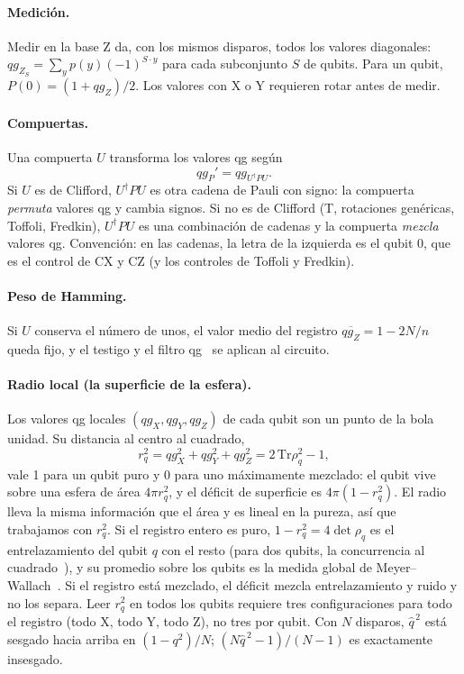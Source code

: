 \documentclass[11pt]{article}
\newcommand{\q}[1]{qg_{#1}}
\newcommand{\qZ}{qg_Z}
\newcommand{\qX}{qg_X}
\newcommand{\qY}{qg_Y}
\begin{document}
\paragraph{Medición.} Medir en la base Z da, con los mismos disparos, todos los valores diagonales:
$\q{Z_S}=\sum_y p(y)(-1)^{S\cdot y}$ para cada subconjunto $S$ de qubits. Para un qubit,
$P(0)=(1+\qZ)/2$. Los valores con X o Y requieren rotar antes de medir.

\paragraph{Compuertas.} Una compuerta $U$ transforma los valores qg según
\begin{equation}\label{eq:regla}
\q{P}'=\q{U^\dagger P U}.
\end{equation}
Si $U$ es de Clifford, $U^\dagger PU$ es otra cadena de Pauli con signo: la compuerta \emph{permuta}
valores qg y cambia signos. Si no es de Clifford (T, rotaciones genéricas, Toffoli, Fredkin), $U^\dagger
PU$ es una combinación de cadenas y la compuerta \emph{mezcla} valores qg. Convención: en las cadenas, la
letra de la izquierda es el qubit 0, que es el control de CX y CZ (y los controles de Toffoli y Fredkin).

\paragraph{Peso de Hamming.} Si $U$ conserva el número de unos, el valor medio del registro
$\overline{\qZ}=1-2N/n$ queda fijo, y el testigo y el filtro qg~\cite{monteverde2026witness} se
aplican al circuito.

\paragraph{Radio local (la superficie de la esfera).} Los valores qg locales $(\qX,\qY,\qZ)$ de cada qubit son
un punto de la bola unidad. Su distancia al centro al cuadrado,
\begin{equation}\label{eq:radio}
r_q^2=\qX^2+\qY^2+\qZ^2=2\,\mathrm{Tr}\rho_q^2-1,
\end{equation}
vale 1 para un qubit puro y 0 para uno máximamente mezclado: el qubit vive sobre una esfera de área
$4\pi r_q^2$, y el déficit de superficie es $4\pi(1-r_q^2)$. El radio lleva la misma información que el área y es
lineal en la pureza, así que trabajamos con $r_q^2$. Si el registro entero es puro, $1-r_q^2=4\det\rho_q$ es el
entrelazamiento del qubit $q$ con el resto (para dos qubits, la concurrencia al cuadrado~\cite{wootters1998,coffman2000}),
y su promedio sobre los qubits es la medida global de Meyer--Wallach~\cite{meyer2002,brennen2003}. Si el registro
está mezclado, el déficit mezcla entrelazamiento y ruido y no los separa. Leer $r_q^2$ en todos los qubits
requiere tres configuraciones para todo el registro (todo X, todo Y, todo Z), no tres por qubit. Con $N$
disparos, $\hat q^{\,2}$ está sesgado hacia arriba en $(1-q^2)/N$; $(N\hat q^{\,2}-1)/(N-1)$ es exactamente
insesgado.
\end{document}
